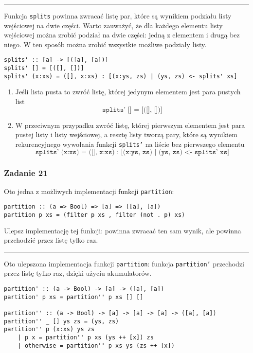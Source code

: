 \documentclass[11pt,a4paper]{article}
\begin{document}
\bigskip
\hrule
\bigskip

Funkcja \texttt{splits} powinna zwracać listę par, które są wynikiem podziału listy wejściowej na dwie części. Warto zauważyć, że dla każdego elementu listy wejściowej można zrobić podział na dwie części: jedną z elementem i drugą bez niego. W ten sposób można zrobić wszystkie możliwe podziały listy.

\begin{Verbatim}[frame=single]
splits' :: [a] -> [([a], [a])]
splits' [] = [([], [])]
splits' (x:xs) = ([], x:xs) : [(x:ys, zs) | (ys, zs) <- splits' xs]
\end{Verbatim}

\begin{enumerate}
    \item Jeśli lista pusta to zwróć listę, której jedynym elementem jest para pustych list
        \[
            \texttt{splits' [] = [([], [])]}
        \]
    \item W przeciwnym przypadku zwróć listę, której pierwszym elementem jest para pustej listy i listy wejściowej, a resztę listy tworzą pary, które są wynikiem rekurencyjnego wywołania funkcji \texttt{splits'} na liście bez pierwszego elementu
        \[
            \texttt{splits' (x:xs) = ([], x:xs) : [(x:ys, zs) | (ys, zs) <- splits' xs]}
        \]
\end{enumerate}


\subsubsection{Zadanie 21}
Oto jedna z możliwych implementacji funkcji \texttt{partition}:
\begin{Verbatim}[frame=single]
partition :: (a => Bool) => [a] => ([a], [a])
partition p xs = (filter p xs , filter (not . p) xs)
\end{Verbatim}
Ulepsz implementację tej funkcji: powinna zwracać ten sam wynik, ale powinna przchodzić przez listę tylko raz.

\bigskip
\hrule
\bigskip

Oto ulepszona implementacja funkcji \texttt{partition}: funkcja \texttt{partition'} przechodzi przez listę tylko raz, dzięki użyciu akumulatorów.

\begin{Verbatim}[frame=single]
partition' :: (a -> Bool) -> [a] -> ([a], [a])
partition' p xs = partition'' p xs [] []

partition'' :: (a -> Bool) -> [a] -> [a] -> [a] -> ([a], [a])
partition'' _ [] ys zs = (ys, zs)
partition'' p (x:xs) ys zs
    | p x = partition'' p xs (ys ++ [x]) zs
    | otherwise = partition'' p xs ys (zs ++ [x])
\end{Verbatim}
\end{document}
